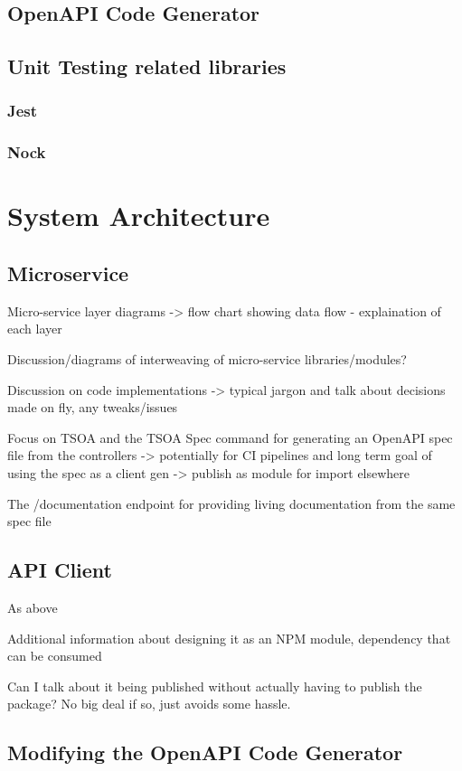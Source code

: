 \subsection{OpenAPI Code Generator}

\subsection{Unit Testing related libraries}
\subsubsection{Jest}
\subsubsection{Nock}
    
\section{System Architecture}
\subsection{Microservice}
Micro-service layer diagrams -> flow chart showing data flow - explaination of each layer

Discussion/diagrams of interweaving of micro-service libraries/modules?

Discussion on code implementations -> typical jargon and talk about decisions made on fly, any tweaks/issues

Focus on TSOA and the TSOA Spec command for generating an OpenAPI spec file from the controllers -> potentially for CI pipelines and long term goal of using the spec as a client gen -> publish as module for import elsewhere

The /documentation endpoint for providing living documentation from the same spec file

\subsection{API Client}
As above

Additional information about designing it as an NPM module, dependency that can be consumed 

Can I talk about it being published without actually having to publish the package? No big deal if so, just avoids some hassle.

\subsection{Modifying the OpenAPI Code Generator}


